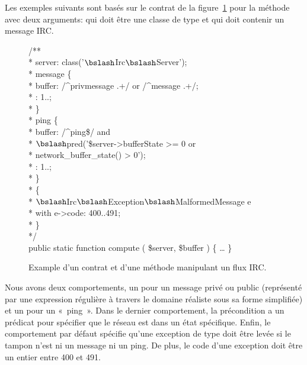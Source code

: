 Les exemples suivants sont basés sur le contrat de la
figure~\ref{figure:test:irc} pour la méthode  avec deux arguments:
 qui doit être une classe de type
 et  qui doit contenir un message
IRC.
%
\begin{figure}

\begin{bigpre}
/** \\
 * \arequires server: class('\(\bslash\)Irc\(\bslash\)Server'); \\
 * \abehavior message \{ \\
 *     \arequires buffer: /^privmessage .+/ or /^message .+/; \\
 *     \aensures  \aresult: 1..; \\
 * \} \\
 * \abehavior ping \{ \\
 *     \arequires buffer: /^ping\$/ and \\
 *               \(\bslash\)pred('\$server->bufferState   >= 0 or \\
 *                      network\_buffer\_state() >  0'); \\
 *     \aensures  \aresult: 1..; \\
 * \} \\
 * \adefault \{ \\
 *     \athrowable \(\bslash\)Irc\(\bslash\)Exception\(\bslash\)MalformedMessage e \\
 *                    with e->code: 400..491; \\
 * \} \\
 */ \\
public static function compute ( \$server, \$buffer ) \{ … \}
\end{bigpre}

\caption{\label{figure:test:irc} Example d'un contrat et d'une méthode
manipulant un flux IRC.}

\end{figure}
%
Nous avons deux comportements, un pour un message privé ou public (représenté
par une expression régulière à travers le domaine réaliste  sous sa
forme simplifiée) et un pour un «~ping~». Dans le dernier comportement, la
précondition a un prédicat pour spécifier que le réseau est dans un état
spécifique. Enfin, le comportement par défaut spécifie qu'une exception de type
 doit être levée
si le tampon n'est ni un message ni un ping. De plus, le code d'une exception
doit être un entier entre 400 et 491.

